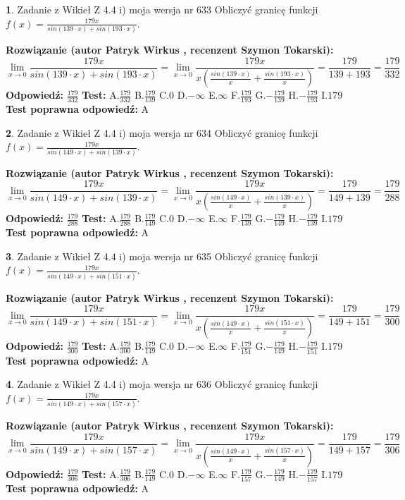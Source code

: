 \documentclass[12pt, a4paper]{article}
\theoremstyle{definition} %
\newtheorem{zad}{}
\newcommand{\zadStart}[1]{\begin{zad}#1\newline}
\newcommand{\zadStop}{\end{zad}}
\newcommand{\rozwStart}[2]{\noindent \textbf{Rozwiązanie (autor #1 , recenzent #2): }\newline}
\newcommand{\rozwStop}{\newline}
\newcommand{\odpStart}{\noindent \textbf{Odpowiedź:}\newline}
\newcommand{\odpStop}{\newline}
\newcommand{\testStart}{\noindent \textbf{Test:}\newline}
\newcommand{\testStop}{\newline}
\newcommand{\kluczStart}{\noindent \textbf{Test poprawna odpowiedź:}\newline}
\newcommand{\kluczStop}{\newline}
\begin{document}
\zadStart{Zadanie z Wikieł Z 4.4 i) moja wersja nr 633}
Obliczyć granicę funkcji $f(x)=\frac{179x}{sin(139\cdot x) +sin(193\cdot x)}$.
\zadStop
\rozwStart{Patryk Wirkus}{Szymon Tokarski}
$$\lim\limits_{x\to 0}\frac{179x}{sin(139\cdot x) +sin(193\cdot x)}=\lim\limits_{x\to 0}\frac{179x}{x(\frac{sin(139\cdot x)}{x}+\frac{sin(193\cdot x)}{x})}=\frac{179}{139+193} = \frac{179}{332}$$
\rozwStop
\odpStart
$\frac{179}{332}$
\odpStop
\testStart
A.$\frac{179}{332}$
B.$\frac{179}{139}$
C.$0$
D.$-\infty$
E.$\infty$
F.$\frac{179}{193}$
G.$-\frac{179}{139}$
H.$-\frac{179}{193}$
I.$179$
\testStop
\kluczStart
A
\kluczStop



\zadStart{Zadanie z Wikieł Z 4.4 i) moja wersja nr 634}
Obliczyć granicę funkcji $f(x)=\frac{179x}{sin(149\cdot x) +sin(139\cdot x)}$.
\zadStop
\rozwStart{Patryk Wirkus}{Szymon Tokarski}
$$\lim\limits_{x\to 0}\frac{179x}{sin(149\cdot x) +sin(139\cdot x)}=\lim\limits_{x\to 0}\frac{179x}{x(\frac{sin(149\cdot x)}{x}+\frac{sin(139\cdot x)}{x})}=\frac{179}{149+139} = \frac{179}{288}$$
\rozwStop
\odpStart
$\frac{179}{288}$
\odpStop
\testStart
A.$\frac{179}{288}$
B.$\frac{179}{149}$
C.$0$
D.$-\infty$
E.$\infty$
F.$\frac{179}{139}$
G.$-\frac{179}{149}$
H.$-\frac{179}{139}$
I.$179$
\testStop
\kluczStart
A
\kluczStop



\zadStart{Zadanie z Wikieł Z 4.4 i) moja wersja nr 635}
Obliczyć granicę funkcji $f(x)=\frac{179x}{sin(149\cdot x) +sin(151\cdot x)}$.
\zadStop
\rozwStart{Patryk Wirkus}{Szymon Tokarski}
$$\lim\limits_{x\to 0}\frac{179x}{sin(149\cdot x) +sin(151\cdot x)}=\lim\limits_{x\to 0}\frac{179x}{x(\frac{sin(149\cdot x)}{x}+\frac{sin(151\cdot x)}{x})}=\frac{179}{149+151} = \frac{179}{300}$$
\rozwStop
\odpStart
$\frac{179}{300}$
\odpStop
\testStart
A.$\frac{179}{300}$
B.$\frac{179}{149}$
C.$0$
D.$-\infty$
E.$\infty$
F.$\frac{179}{151}$
G.$-\frac{179}{149}$
H.$-\frac{179}{151}$
I.$179$
\testStop
\kluczStart
A
\kluczStop



\zadStart{Zadanie z Wikieł Z 4.4 i) moja wersja nr 636}
Obliczyć granicę funkcji $f(x)=\frac{179x}{sin(149\cdot x) +sin(157\cdot x)}$.
\zadStop
\rozwStart{Patryk Wirkus}{Szymon Tokarski}
$$\lim\limits_{x\to 0}\frac{179x}{sin(149\cdot x) +sin(157\cdot x)}=\lim\limits_{x\to 0}\frac{179x}{x(\frac{sin(149\cdot x)}{x}+\frac{sin(157\cdot x)}{x})}=\frac{179}{149+157} = \frac{179}{306}$$
\rozwStop
\odpStart
$\frac{179}{306}$
\odpStop
\testStart
A.$\frac{179}{306}$
B.$\frac{179}{149}$
C.$0$
D.$-\infty$
E.$\infty$
F.$\frac{179}{157}$
G.$-\frac{179}{149}$
H.$-\frac{179}{157}$
I.$179$
\testStop
\kluczStart
A
\kluczStop
\end{document}
